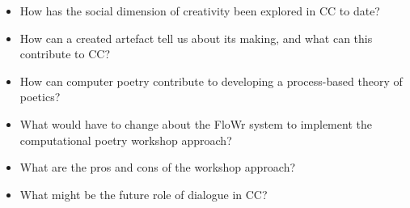 \begin{itemize}
\item How has the social dimension of creativity been explored in CC to date? 
\item How can a created artefact tell us about its making, and what can this contribute to CC?
\item How can computer poetry contribute to developing a process-based theory of poetics? 
\item What would have to change about the FloWr system to implement the computational poetry workshop approach?
\item What are the pros and cons of the workshop approach?
\item What might be the future role of dialogue in CC?
\end{itemize}


